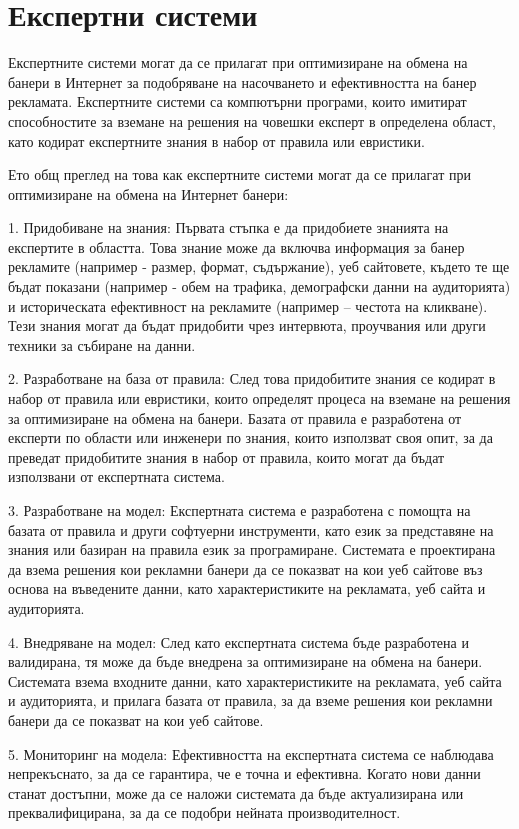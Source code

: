 \section{Експертни системи}

Експертните системи могат да се прилагат при оптимизиране на обмена на банери в Интернет за подобряване на насочването и ефективността на банер рекламата. Експертните системи са компютърни програми, които имитират способностите за вземане на решения на човешки експерт в определена област, като кодират експертните знания в набор от правила или евристики.

Ето общ преглед на това как експертните системи могат да се прилагат при оптимизиране на обмена на Интернет банери:

1. Придобиване на знания: Първата стъпка е да придобиете знанията на експертите в областта. Това знание може да включва информация за банер рекламите (например - размер, формат, съдържание), уеб сайтовете, където те ще бъдат показани (например - обем на трафика, демографски данни на аудиторията) и историческата ефективност на рекламите (например – честота на кликване). Тези знания могат да бъдат придобити чрез интервюта, проучвания или други техники за събиране на данни.

2. Разработване на база от правила: След това придобитите знания се кодират в набор от правила или евристики, които определят процеса на вземане на решения за оптимизиране на обмена на банери. Базата от правила е разработена от експерти по области или инженери по знания, които използват своя опит, за да преведат придобитите знания в набор от правила, които могат да бъдат използвани от експертната система.

3. Разработване на модел: Експертната система е разработена с помощта на базата от правила и други софтуерни инструменти, като език за представяне на знания или базиран на правила език за програмиране. Системата е проектирана да взема решения кои рекламни банери да се показват на кои уеб сайтове въз основа на въведените данни, като характеристиките на рекламата, уеб сайта и аудиторията.

4. Внедряване на модел: След като експертната система бъде разработена и валидирана, тя може да бъде внедрена за оптимизиране на обмена на банери. Системата взема входните данни, като характеристиките на рекламата, уеб сайта и аудиторията, и прилага базата от правила, за да вземе решения кои рекламни банери да се показват на кои уеб сайтове.

5. Мониторинг на модела: Ефективността на експертната система се наблюдава непрекъснато, за да се гарантира, че е точна и ефективна. Когато нови данни станат достъпни, може да се наложи системата да бъде актуализирана или преквалифицирана, за да се подобри нейната производителност.

